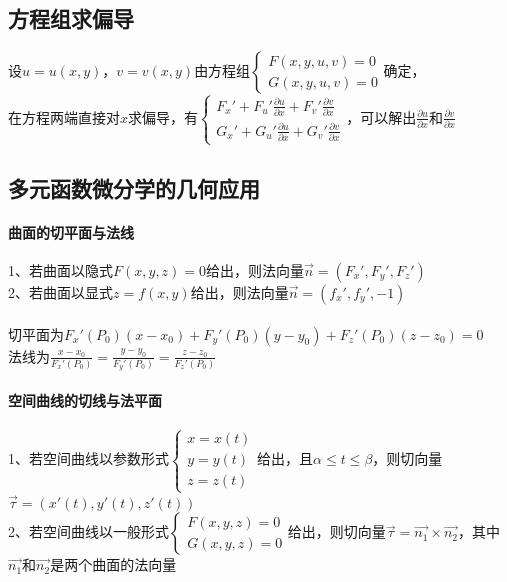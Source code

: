 \documentclass{article}
\begin{document}
\begin{flushleft}
	\subsection{方程组求偏导}
	
	设$u=u(x,y)$，$v=v(x,y)$由方程组$\left\{
	\begin{array}{lcl}
	F(x,y,u,v)=0\\
	G(x,y,u,v)=0
	\end{array} \right.$确定，\\
	在方程两端直接对$x$求偏导，有$\left\{
	\begin{array}{lcl}
	F_x'+F_u'\frac{\partial u}{\partial x}+F_v'\frac{\partial v}{\partial x}\\
	G_x'+G_u'\frac{\partial u}{\partial x}+G_v'\frac{\partial v}{\partial x}
	\end{array} \right.$，可以解出$\frac{\partial u}{\partial x}$和$\frac{\partial v}{\partial x}$\\
	
	\subsection{多元函数微分学的几何应用}
	
	\paragraph{曲面的切平面与法线}
	1、若曲面以隐式$F(x,y,z)=0$给出，则法向量$\vec{n}=(F_x',F_y',F_z')$\\
	2、若曲面以显式$z=f(x,y)$给出，则法向量$\vec{n}=(f_x',f_y',-1)$\\
	~\\
	切平面为$F_x'(P_0)(x-x_0)+F_y'(P_0)(y-y_0)+F_z'(P_0)(z-z_0)=0$\\
	法线为$\frac{x-x_0}{F_x'(P_0)}=\frac{y-y_0}{F_y'(P_0)}=\frac{z-z_0}{F_z'(P_0)}$\\
	
	\paragraph{空间曲线的切线与法平面}
	1、若空间曲线以参数形式$\left\{
	\begin{array}{lcl}
	x=x(t)\\
	y=y(t)\\
	z=z(t)
	\end{array} \right.$给出，且$\alpha\le t\le\beta$，则切向量$\vec{\tau}=(x'(t),y'(t),z'(t))$\\
	2、若空间曲线以一般形式$\left\{
	\begin{array}{lcl}
	F(x,y,z)=0\\
	G(x,y,z)=0
	\end{array} \right.$给出，则切向量$\vec{\tau}=\vec{n_1}\times\vec{n_2}$，其中$\vec{n_1}$和$\vec{n_2}$是两个曲面的法向量\\
	

\end{flushleft}
\end{document}
